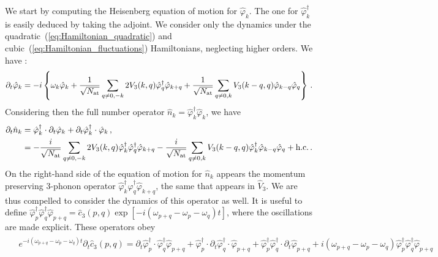 \documentclass[aps,prd,notitlepage,amsfonts,amssymb,amsmath,nofootinbib,superscriptaddress,longbibliography]{revtex4-2}
\begin{document}
\begin{appendices}
We start by computing the Heisenberg equation of motion for $\hat{\varphi}_{k}$. The one for $\hat{\varphi}^{\dagger}_{k}$ is easily deduced by taking the adjoint. We consider only the dynamics under the quadratic~(\ref{eq:Hamiltonian_quadratic}) and cubic~(\ref{eq:Hamiltonian_fluctuations}) Hamiltonians, neglecting higher orders. We have :
\begin{align}
\begin{split}
\label{eq:eom_varphi_k}
    \partial_{t}\hat{\varphi}_{k} = -i \left\{ \omega_{k} \hat{\varphi}_{k} + \frac{1}{\sqrt{N_{\rm at}}} \sum_{q \neq 0  , -k }  2 V_{3}(k,q) \hat{\varphi}_{q}^{\dagger} \hat{\varphi}_{k+q}
    + \frac{1}{\sqrt{N_{\rm at}}} \sum_{q \neq 0 , k } V_{3}(k-q,q) \hat{\varphi}_{k-q} \hat{\varphi}_{q} \right\} \,.
\end{split}
\end{align}
Considering then the full number operator $\hat{n}_{k} = \hat{\varphi}_{k}^{\dagger} \hat{\varphi}_{k}$, we have
\begin{align}
\begin{split}
\label{eq:nk_evolution}
    \partial_{t}\hat{n}_{k} &= \hat{\varphi}_{k}^{\dagger} \cdot \partial_{t}\hat{\varphi}_{k} + \partial_{t} \hat{\varphi}_{k}^{\dagger} \cdot \hat{\varphi}_{k} \, , \\
    &= - \frac{i}{\sqrt{N_{\rm at}}} \sum_{q \neq 0  , -k } 2 V_{3}(k,q) \hat{\varphi}_{k}^{\dagger} \hat{\varphi}_{q}^{\dagger} \hat{\varphi}_{k+q} - \frac{i}{\sqrt{N_{\rm at}}}   \sum_{q \neq 0  , k } V_{3}(k-q,q) \hat{\varphi}_{k}^{\dagger} \hat{\varphi}_{k-q} \hat{\varphi}_{q}   + {\rm h.c.} \, .
\end{split}
\end{align}
On the right-hand side of the equation of motion for $\hat{n}_{k}$ appears the momentum preserving 3-phonon operator $\hat{\varphi}_{k}^{\dagger} \hat{\varphi}_{q}^{\dagger} \hat{\varphi}_{k+q}$, the same that appears in $\hat{V}_{3}$. We are thus compelled to consider the dynamics of this operator as well. 
It is useful to define $\hat{\varphi}_{p}^{\dagger} \hat{\varphi}_{q}^{\dagger} \hat{\varphi}_{p+q} = \hat{c}_{3}(p,q) \exp \left[  -i \left( \omega_{p+q} - \omega_{p} - \omega_{q} \right)  t \right]$, where the oscillations are made explicit. These operators obey
\begin{align}
\begin{split}
\label{eq:c3pq_evolution}
& e^{ - i \left( \omega_{p+q} - \omega_{p} - \omega_{q} \right)  t  } \partial_{t}\hat{c}_{3}(p,q) =   \partial_{t}\hat{\varphi}_{p}^{\dagger} \cdot \hat{\varphi}_{q}^{\dagger} \hat{\varphi}_{p+q} + \hat{\varphi}_{p}^{\dagger} \cdot \partial_{t} \hat{\varphi}_{q}^{\dagger} \cdot \hat{\varphi}_{p+q}  + \hat{\varphi}_{p}^{\dagger} \hat{\varphi}_{q}^{\dagger} \cdot \partial_{t}\hat{\varphi}_{p+q} + i \left( \omega_{p+q} - \omega_{p} - \omega_{q} \right) \hat{\varphi}_{p}^{\dagger} \hat{\varphi}_{q}^{\dagger} \hat{\varphi}_{p+q} \\

\end{split}
\end{align}
\end{appendices}
\end{document}
